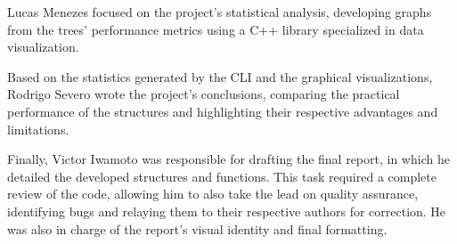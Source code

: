 Lucas Menezes focused on the project's statistical analysis, developing graphs from the trees' performance metrics using a C++ library specialized in data visualization.

Based on the statistics generated by the CLI and the graphical visualizations, Rodrigo Severo wrote the project's conclusions, comparing the practical performance of the structures and highlighting their respective advantages and limitations.

Finally, Victor Iwamoto was responsible for drafting the final report, in which he detailed the developed structures and functions. This task required a complete review of the code, allowing him to also take the lead on quality assurance, identifying bugs and relaying them to their respective authors for correction. He was also in charge of the report's visual identity and final formatting.